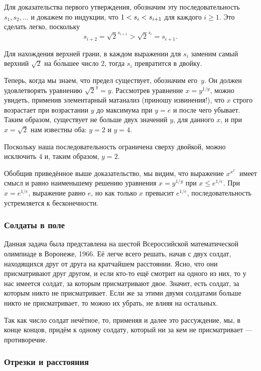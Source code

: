 Для доказательства первого утверждения, обозначим эту последовательность
$s_1, s_2,\dots$ и докажем по индукции, что $1<s_i\z<s_{i+1}$
для каждого $i\ge 1$.
Это сделать легко, поскольку \[s_{i+2}=
{\sqrt{2}}^{s_{i+1}}
>{\sqrt{2}}^{s_{i}}
=s_{i+1}.\]

Для нахождения верхней грани, в каждом выражении для $s_i$ заменим самый верхний $\sqrt{2}$ на б\'{о}льшее число $2$, тогда $s_i$ превратится в двойку.

Теперь, когда мы знаем, что предел существует, обозначим его~$y$.
Он должен удовлетворять уравнению ${\sqrt{2}}^y=y$.
Рассмотрев уравнение $x=y^{1/y}$, 
можно увидеть, применив элементарный матанализ (приношу извинения!), 
что $x$ строго возрастает при возрастании $y$ до максимума при $y=e$
и после чего убывает.
Таким образом, существует не больше двух значений $y$, для данного $x$, 
и при $x=\sqrt{2}$ нам известны оба: $y=2$ и $y=4$.

Поскольку наша последовательность ограничена сверху двойкой, можно исключить $4$ и, таким образом, $y=2$.\heart

Обобщив приведённое выше доказательство, мы видим, что выражение $x^{x^{x^{{\cdot}^{\cdot}}}}$
имеет смысл и равно наименьшему решению уравнения $x=y^{1/y}$ при $x\le e^{1/e}$.
При $x=e^{1/e}$, выражение равно $e$, но как только $x$ превысит $e^{1/e}$, последовательность устремляется к бесконечности.

\subsubsection*{Солдаты в поле}%

Данная задача была представлена на шестой Всероссийской математической олимпиаде в Воронеже, 1966.
Её легче всего решать, начав с двух солдат, находящихся друг от друга на кратчайшем расстоянии.
Ясно, что они присматривают друг другом, и если кто-то ещё смотрит на одного из них, то у нас имеется солдат, за которым присматривают двое. 
Значит, есть солдат, за которым никто не присматривает.
Если же за этими двумя солдатами больше никто не присматривает, то можно их убрать, не влияя на остальных.

Так как число солдат нечётное, то, применяя и далее это рассуждение, мы, в конце концов, придём к одному солдату, который ни за кем не присматривает --- противоречие.\heart

\subsubsection*{Отрезки и расстояния} %

